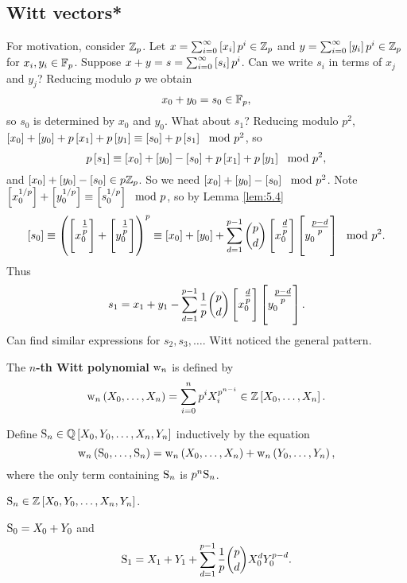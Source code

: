 \subsection{Witt vectors*}

For motivation, consider $ \ZZ_p $. Let $ x = \sum_{i = 0}^\infty \sbr{x_i}p^i \in \ZZ_p $ and $ y = \sum_{i = 0}^\infty \sbr{y_i}p^i \in \ZZ_p $ for $ x_i, y_i \in \FF_p $. Suppose $ x + y = s = \sum_{i = 0}^\infty \sbr{s_i}p^i $. Can we write $ s_i $ in terms of $ x_j $ and $ y_j $? Reducing modulo $ p $ we obtain
$$ x_0 + y_0 = s_0 \in \FF_p, $$
so $ s_0 $ is determined by $ x_0 $ and $ y_0 $. What about $ s_1 $? Reducing modulo $ p^2 $, $ \sbr{x_0} + \sbr{y_0} + p\sbr{x_1} + p\sbr{y_1} \equiv \sbr{s_0} + p\sbr{s_1} \mod p^2 $, so
$$ p\sbr{s_1} \equiv \sbr{x_0} + \sbr{y_0} - \sbr{s_0} + p\sbr{x_1} + p\sbr{y_1} \mod p^2, $$
and $ \sbr{x_0} + \sbr{y_0} - \sbr{s_0} \in p\ZZ_p $. So we need $ \sbr{x_0} + \sbr{y_0} - \sbr{s_0} \mod p^2 $. Note $ \sbr{x_0^{1 / p}} + \sbr{y_0^{1 / p}} \equiv \sbr{s_0^{1 / p}} \mod p $, so by Lemma \ref{lem:5.4}
$$ \sbr{s_0} \equiv \br{\sbr{x_0^{\tfrac{1}{p}}} + \sbr{y_0^{\tfrac{1}{p}}}}^p \equiv \sbr{x_0} + \sbr{y_0} + \sum_{d = 1}^{p - 1} \binom{p}{d}\sbr{x_0^{\tfrac{d}{p}}}\sbr{y_0^{\tfrac{p - d}{p}}} \mod p^2. $$
Thus
$$ s_1 = x_1 + y_1 - \sum_{d = 1}^{p - 1} \dfrac{1}{p}\binom{p}{d}\sbr{x_0^{\tfrac{d}{p}}}\sbr{y_0^{\tfrac{p - d}{p}}}. $$
Can find similar expressions for $ s_2, s_3, \dots $. Witt noticed the general pattern.

\pagebreak

\begin{definition}
The \textbf{$ n $-th Witt polynomial} $ \w_n $ is defined by
$$ \w_n\br{X_0, \dots, X_n} = \sum_{i = 0}^n p^iX_i^{p^{n - i}} \in \ZZ\sbr{X_0, \dots, X_n}. $$
\end{definition}

Define $ \S_n \in \QQ\sbr{X_0, Y_0, \dots, X_n, Y_n} $ inductively by the equation
$$ \w_n\br{\S_0, \dots, \S_n} = \w_n\br{X_0, \dots, X_n} + \w_n\br{Y_0, \dots, Y_n}, $$
where the only term containing $ \S_n $ is $ p^n\S_n $.

\begin{fact*}[Witt]
$ \S_n \in \ZZ\sbr{X_0, Y_0, \dots, X_n, Y_n} $.
\end{fact*}

\begin{example*}
$ \S_0 = X_0 + Y_0 $ and
$$ \S_1 = X_1 + Y_1 + \sum_{d = 1}^{p - 1} \dfrac{1}{p}\binom{p}{d}X_0^dY_0^{p - d}. $$
\end{example*}

